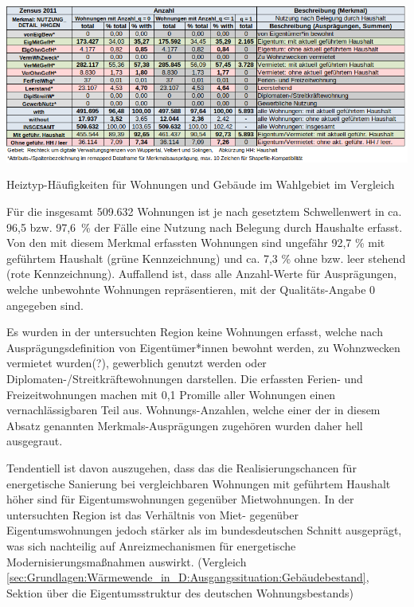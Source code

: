 			\begin{table}[h]
				\includegraphics[width=\linewidth]{./Medien/tables/Zensus_wohn_analysis_q0_q1_nutzung_vgl.png}
				\caption{Heiztyp-Häufigkeiten für Wohnungen und Gebäude im Wahlgebiet im Vergleich}
				\label{tab:analyse:zensus:wohn_q0_q1_nutzung_vgl}
			\end{table}
		
			Für die insgesamt 509.632 Wohnungen ist je nach gesetztem Schwellenwert in ca. 96,5 bzw. 97,6~\% der Fälle eine Nutzung nach Belegung durch Haushalte erfasst. Von den mit diesem Merkmal erfassten Wohnungen sind ungefähr 92,7 \% mit geführtem Haushalt (grüne Kennzeichnung) und ca. 7,3 \% ohne bzw. leer stehend (rote Kennzeichnung). Auffallend ist, dass alle Anzahl-Werte für Ausprägungen, welche unbewohnte Wohnungen repräsentieren, mit der Qualitäts-Angabe 0 angegeben sind. 
		
			Es wurden in der untersuchten Region keine Wohnungen erfasst, welche nach Ausprägungsdefinition von Eigentümer*innen bewohnt werden, zu Wohnzwecken vermietet wurden(?), gewerblich genutzt werden oder Diplomaten-/Streitkräftewohnungen darstellen. Die erfassten Ferien- und Freizeitwohnungen machen mit 0,1 Promille aller Wohnungen einen vernachlässigbaren Teil aus. Wohnungs-Anzahlen, welche einer der in diesem Absatz genannten Merkmals-Ausprägungen zugehören wurden daher hell ausgegraut. 
					
			Tendentiell ist davon auszugehen, dass das die Realisierungschancen für energetische Sanierung bei vergleichbaren Wohnungen mit geführtem Haushalt höher sind für Eigentumswohnungen gegenüber Mietwohnungen. In der untersuchten Region ist das Verhältnis von Miet- gegenüber Eigentumswohnungen jedoch stärker als im bundesdeutschen Schnitt ausgeprägt, was sich nachteilig auf Anreizmechanismen für energetische Modernisierungsmaßnahmen auswirkt. (Vergleich \autoref{sec:Grundlagen:Wärmewende_in_D:Ausgangssituation:Gebäudebestand}, Sektion über die Eigentumsstruktur des deutschen Wohnungsbestands)
			 
